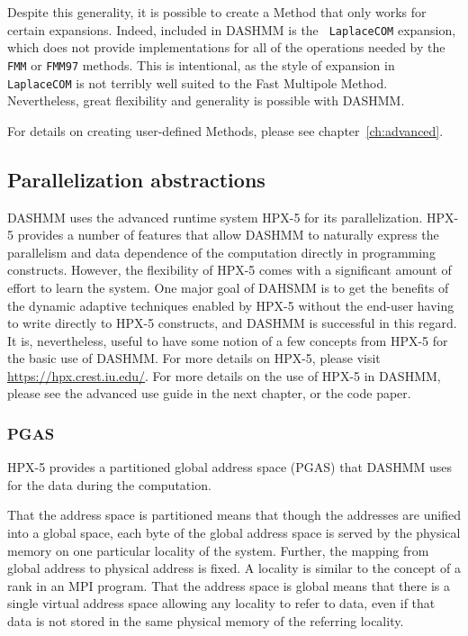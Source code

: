 Despite this generality, it is possible to create a Method that only
works for certain expansions. Indeed, included in DASHMM is the {\tt
  LaplaceCOM} expansion, which does not provide implementations for
all of the operations needed by the {\tt FMM} or {\tt FMM97}
methods. This is intentional, as the style of expansion in {\tt
  LaplaceCOM} is not terribly well suited to the Fast Multipole
Method. Nevertheless, great flexibility and generality is possible
with DASHMM.

For details on creating user-defined Methods, please see
chapter~\ref{ch:advanced}.

\subsection{Parallelization abstractions}

DASHMM uses the advanced runtime system HPX-5 for its
parallelization. HPX-5 provides a number of features that allow DASHMM
to naturally express the parallelism and data dependence of the
computation directly in programming constructs. However, the
flexibility of HPX-5 comes with a significant amount of effort to
learn the system. One major goal of DAHSMM is to get the benefits of
the dynamic adaptive techniques enabled by HPX-5 without the end-user
having to write directly to HPX-5 constructs, and DASHMM is successful
in this regard. It is, nevertheless, useful to have some notion of a
few concepts from HPX-5 for the basic use of DASHMM. For more details
on HPX-5, please visit \url{https://hpx.crest.iu.edu/}. For more
details on the use of HPX-5 in DASHMM, please see the advanced use
guide in the next chapter, or the code paper.

\subsubsection{PGAS}

HPX-5 provides a partitioned global address space (PGAS) that DASHMM uses for
the data during the computation.

That the address space is partitioned means that though the addresses are
unified into a global space, each byte of the global address space is served
by the physical memory on one particular locality of the system. Further,
the mapping from global address to physical address is fixed. A locality
is similar to the concept of a rank in an MPI program. That the address space
is global means that there is a single virtual address space allowing any
locality to refer to data, even if that data is not stored in the same physical
memory of the referring locality.

